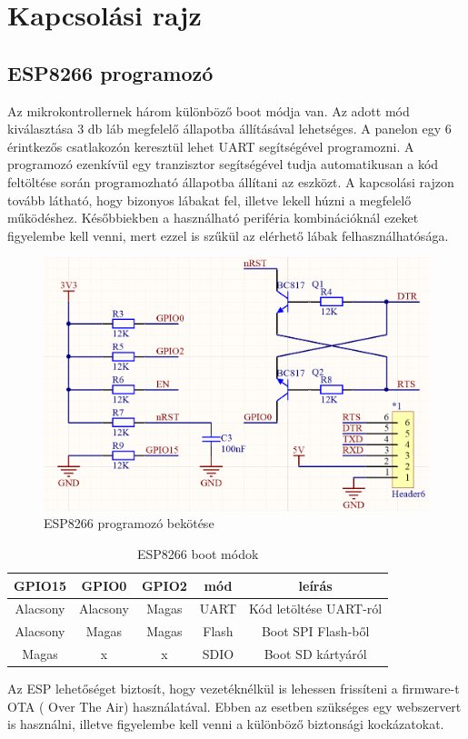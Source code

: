 \section{Kapcsolási rajz}

\subsection{ESP8266 programozó}
Az mikrokontrollernek három különböző boot módja van. Az adott mód kiválasztása 3 db láb megfelelő állapotba állításával lehetséges. A panelon egy 6 érintkezős csatlakozón keresztül lehet UART segítségével programozni. A programozó ezenkívül egy tranzisztor segítségével tudja automatikusan a kód feltöltése során programozható állapotba állítani az eszközt. A kapcsolási rajzon tovább látható, hogy bizonyos lábakat fel, illetve lekell húzni a megfelelő működéshez. Későbbiekben a használható periféria kombinációknál ezeket figyelembe kell venni, mert ezzel is szűkül az elérhető lábak felhasználhatósága.

\begin{figure}[!ht]
    \centering
    \includegraphics[width=130mm, keepaspectratio]{figures/programmer.png}
    \caption{ESP8266 programozó bekötése}
    \label{fig:TeXstudio}
\end{figure}

\begin{table}[ht]
	\footnotesize
	\centering
	\begin{tabular}{ | c | c | c | c | c |}
		\toprule
		GPIO15 & GPIO0 & GPIO2 & mód & leírás \\
		\midrule
        Alacsony & Alacsony & Magas & UART & Kód letöltése UART-ról \\
        \hline
        Alacsony & Magas & Magas & Flash & Boot SPI Flash-ből \\
        \hline
		Magas & x  & x & SDIO & Boot SD kártyáról \\
		\bottomrule
	\end{tabular}
	\caption{ESP8266 boot módok}
	\label{tab:TabularExample}
\end{table}
Az ESP lehetőséget biztosít, hogy vezetéknélkül is lehessen frissíteni a firmware-t OTA ( Over The Air) használatával. Ebben az esetben szükséges egy webszervert is használni, illetve figyelembe kell venni a különböző biztonsági kockázatokat.

